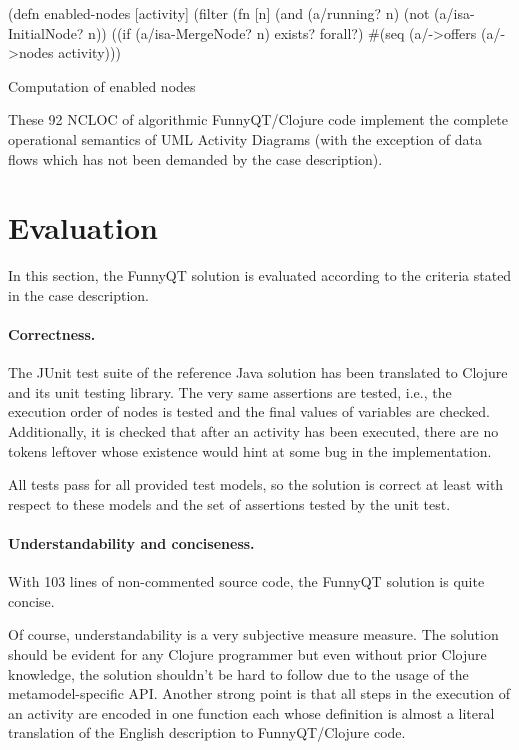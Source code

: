 \documentclass[submission]{eptcs}
\begin{document}
\begin{listing}[h!tb]
\begin{clojurecode}
(defn enabled-nodes [activity]
  (filter (fn [n]
            (and (a/running? n)
                 (not (a/isa-InitialNode? n))
                 ((if (a/isa-MergeNode? n) exists? forall?)
                  #(seq (a/->offers %
          (a/->nodes activity)))
\end{clojurecode}
\caption{Computation of enabled nodes}
\label{lst:enabled-nodes}
\end{listing}

These 92 NCLOC of algorithmic FunnyQT/Clojure code implement the complete
operational semantics of UML Activity Diagrams (with the exception of data
flows which has not been demanded by the case description).

\section{Evaluation}
\label{sec:evaluation}

In this section, the FunnyQT solution is evaluated according to the criteria
stated in the case description.

\paragraph{Correctness.}

The JUnit test suite of the reference Java solution has been translated to
Clojure and its unit testing library.  The very same assertions are tested,
i.e., the execution order of nodes is tested and the final values of variables
are checked.  Additionally, it is checked that after an activity has been
executed, there are no tokens leftover whose existence would hint at some bug
in the implementation.

All tests pass for all provided test models, so the solution is correct at
least with respect to these models and the set of assertions tested by the unit
test.


\paragraph{Understandability and conciseness.}

With 103 lines of non-commented source code, the FunnyQT solution is quite
concise.

Of course, understandability is a very subjective measure measure.  The
solution should be evident for any Clojure programmer but even without prior
Clojure knowledge, the solution shouldn't be hard to follow due to the usage of
the metamodel-specific API.  Another strong point is that all steps in the
execution of an activity are encoded in one function each whose definition is
almost a literal translation of the English description to FunnyQT/Clojure
code.
\end{document}
